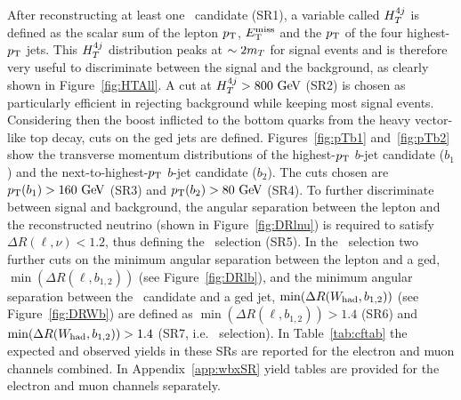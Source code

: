 After reconstructing at least one \whad\ candidate (SR1), a variable called $\htfj$ is defined
as the scalar sum of the lepton $\pt$, $\met$ and the $\pt$
of the four  highest-$\pt$ jets. This $\htfj$ distribution peaks at 
$\sim 2 m_{\T}$ for signal events and is therefore very useful to
discriminate between the signal and the background, as clearly shown
in Figure~\ref{fig:HTAll}. A cut at $\htfj>800\gev$ (SR2) is chosen as particularly
efficient in rejecting background while keeping most signal events.
Considering then the boost inflicted to the bottom quarks from the heavy
vector-like top decay, cuts on the \btag ged jets are defined.
Figures~\ref{fig:pTb1} and~\ref{fig:pTb2} show the transverse momentum distributions
of the highest-$\pt$ $b$-jet candidate ($b_1$) and 
the next-to-highest-$\pt$ $b$-jet candidate ($b_2$).
The cuts chosen are $\pt(b_1) > 160\gev$ (SR3) and $\pt(b_2) >80\gev$ (SR4).
To further discriminate between signal and background,
the angular separation between the lepton and the reconstructed neutrino 
(shown in Figure~\ref{fig:DRlnu}) is
required to satisfy $\Delta R(\ell,\nu)<1.2$, thus defining the 
\loose\ selection (SR5). In the \tight\ selection
two further cuts on the minimum angular separation between the lepton and a \btag ged, 
$\min(\Delta R(\ell, b_{1,2}))$ (see Figure~\ref{fig:DRlb}), 
and the minimum angular separation between the
\whad\ candidate and a \btag ged jet,
$\min(\Delta R(W_{\rm had}, b_{1,2}))$ (see Figure~\ref{fig:DRWb}) are defined as
 $\min(\Delta R(\ell, b_{1,2}))>1.4$ (SR6) and 
$\min(\Delta R(W_{\rm had}, b_{1,2}))>1.4$ (SR7, i.e. \tight\ selection).
In Table~\ref{tab:cftab} the expected and observed yields in these SRs are
reported for the electron and muon channels combined. In Appendix~\ref{app:wbxSR}
yield tables are provided for the  electron and muon channels separately.


